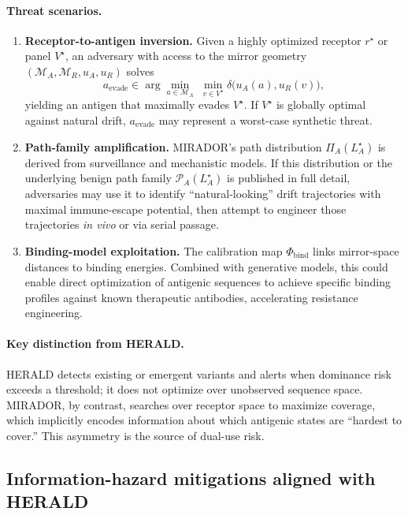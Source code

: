 \documentclass[11pt]{article}
\begin{document}
\paragraph{Threat scenarios.}
\begin{enumerate}
  \item \textbf{Receptor-to-antigen inversion.}
  Given a highly optimized receptor $r^\star$ or panel $V^\star$, an adversary with access to
  the mirror geometry $(\mathcal{M}_A, \mathcal{M}_R, u_A, u_R)$ solves
  \[
    a_{\mathrm{evade}} \in \arg\min_{a \in \mathcal{M}_A} \;\min_{v \in V^\star}
                       \delta\bigl(u_A(a), u_R(v)\bigr),
  \]
  yielding an antigen that maximally evades $V^\star$. If $V^\star$ is globally optimal against
  natural drift, $a_{\mathrm{evade}}$ may represent a worst-case synthetic threat.

  \item \textbf{Path-family amplification.}
  MIRADOR's path distribution $\Pi_A(L_A^\star)$ is derived from surveillance and mechanistic
  models. If this distribution or the underlying benign path family $\mathcal{P}_A(L_A^\star)$
  is published in full detail, adversaries may use it to identify ``natural-looking'' drift
  trajectories with maximal immune-escape potential, then attempt to engineer those trajectories
  \emph{in vivo} or via serial passage.

  \item \textbf{Binding-model exploitation.}
  The calibration map $\Phi_{\mathrm{bind}}$ links mirror-space distances to binding energies.
  Combined with generative models, this could enable direct optimization of antigenic sequences
  to achieve specific binding profiles against known therapeutic antibodies, accelerating
  resistance engineering.
\end{enumerate}

\paragraph{Key distinction from HERALD.}
HERALD detects existing or emergent variants and alerts when dominance risk exceeds a threshold;
it does not optimize over unobserved sequence space. MIRADOR, by contrast, searches over
receptor space to maximize coverage, which implicitly encodes information about which antigenic
states are ``hardest to cover.'' This asymmetry is the source of dual-use risk.

\subsection{Information-hazard mitigations aligned with HERALD}
\label{subsec:mitigations}
\end{document}
